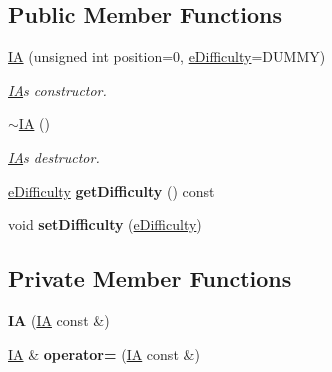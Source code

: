 \subsection*{Public Member Functions}
\begin{DoxyCompactItemize}
\item 
\hyperlink{class_i_a_ad0042cae1d65f26ebe3591f182b8481e}{I\+A} (unsigned int position=0, \hyperlink{_i_a_8hh_a401e35a5e652326cb9a2e566ca8908a7}{e\+Difficulty}=D\+U\+M\+M\+Y)
\begin{DoxyCompactList}\small\item\em \hyperlink{class_i_a}{I\+A}\textquotesingle{}s constructor. \end{DoxyCompactList}\item 
\hypertarget{class_i_a_a67d4dd285ae5169239348432bab9ad0e}{}\hyperlink{class_i_a_a67d4dd285ae5169239348432bab9ad0e}{$\sim$\+I\+A} ()\label{class_i_a_a67d4dd285ae5169239348432bab9ad0e}

\begin{DoxyCompactList}\small\item\em \hyperlink{class_i_a}{I\+A}\textquotesingle{}s destructor. \end{DoxyCompactList}\item 
\hypertarget{class_i_a_ab09c1747d65eb83344a4247b4ab2e1c3}{}\hyperlink{_i_a_8hh_a401e35a5e652326cb9a2e566ca8908a7}{e\+Difficulty} {\bfseries get\+Difficulty} () const \label{class_i_a_ab09c1747d65eb83344a4247b4ab2e1c3}

\item 
\hypertarget{class_i_a_a1d313d5d6e15e65ef9d589a38461a63c}{}void {\bfseries set\+Difficulty} (\hyperlink{_i_a_8hh_a401e35a5e652326cb9a2e566ca8908a7}{e\+Difficulty})\label{class_i_a_a1d313d5d6e15e65ef9d589a38461a63c}

\end{DoxyCompactItemize}
\subsection*{Private Member Functions}
\begin{DoxyCompactItemize}
\item 
\hypertarget{class_i_a_ace629c1328912347b2b397b90efce892}{}{\bfseries I\+A} (\hyperlink{class_i_a}{I\+A} const \&)\label{class_i_a_ace629c1328912347b2b397b90efce892}

\item 
\hypertarget{class_i_a_a94457ee5bc44c37442457d069e8c9cb0}{}\hyperlink{class_i_a}{I\+A} \& {\bfseries operator=} (\hyperlink{class_i_a}{I\+A} const \&)\label{class_i_a_a94457ee5bc44c37442457d069e8c9cb0}

\end{DoxyCompactItemize}
